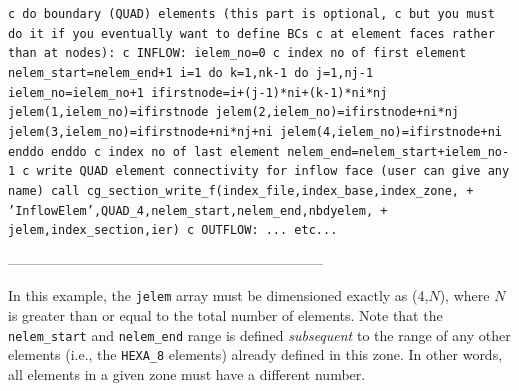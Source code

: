 \documentclass[12pt]{article}
\begin{document}
{\tt \noindent c  do boundary (QUAD) elements (this part is optional,
\newline c  but you must do it if you eventually want to define BCs
\newline c  at element faces rather than at nodes):
\newline c  INFLOW:
\newline\indent      ielem\_no=0
\newline c  index no of first element
\newline\indent      nelem\_start=nelem\_end+1
\newline\indent      i=1
\newline\indent      do k=1,nk-1
\newline\indent\indent        do j=1,nj-1
\newline\indent\indent\indent          ielem\_no=ielem\_no+1
\newline\indent\indent\indent          ifirstnode=i+(j-1)*ni+(k-1)*ni*nj
\newline\indent\indent\indent          jelem(1,ielem\_no)=ifirstnode
\newline\indent\indent\indent          jelem(2,ielem\_no)=ifirstnode+ni*nj
\newline\indent\indent\indent          jelem(3,ielem\_no)=ifirstnode+ni*nj+ni
\newline\indent\indent\indent          jelem(4,ielem\_no)=ifirstnode+ni
\newline\indent\indent        enddo
\newline\indent      enddo
\newline c  index no of last element
\newline\indent      nelem\_end=nelem\_start+ielem\_no-1
\newline c  write QUAD element connectivity for inflow face (user can give any name)
\newline\indent      call cg\_section\_write\_f(index\_file,index\_base,index\_zone,
\newline + \indent   'InflowElem',QUAD\_4,nelem\_start,nelem\_end,nbdyelem,
\newline + \indent   jelem,index\_section,ier)
\newline c  OUTFLOW:
\newline\indent\indent  ... etc...
}

--------------------------------------------------------------------

In this example, the {\tt jelem} array must be dimensioned exactly
as (4,$N$), where $N$ is greater than or equal to the total number
of elements.  Note that the {\tt nelem\_start} and {\tt nelem\_end}
range is defined {\it subsequent} to the range of any other
elements (i.e., the {\tt HEXA\_8} elements) already defined in this zone.
In other words, all elements in a given zone must have a different
number.
\end{document}
